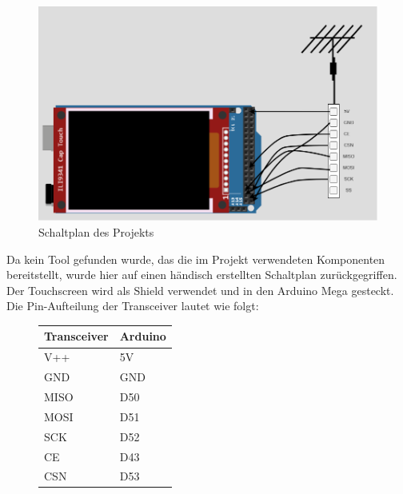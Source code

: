\documentclass[a4paper, 11pt]{scrartcl}
\begin{document}
\begin{small}
\begin{figure}[H]
    \begin{center}
        \includegraphics[scale=0.4]{Bilder/schaltplan.png}
        \caption{Schaltplan des Projekts}\label{diag:schaltplan}
    \end{center}
\end{figure}

Da kein Tool gefunden wurde, das die im Projekt verwendeten Komponenten bereitstellt, wurde hier auf einen händisch erstellten Schaltplan zurückgegriffen.
Der Touchscreen wird als Shield verwendet und in den Arduino Mega gesteckt. Die Pin-Aufteilung der Transceiver lautet wie folgt:

\begin{figure}[H]
    \begin{tabular}{|p{}|p{}|}
        \hline
        \textbf{Transceiver} & \textbf{Arduino}
        \\
        \hline\hline
        V++ & 5V
        \\
        \hline
        GND & GND
        \\
        \hline
        MISO & D50
        \\
        \hline
        MOSI & D51
        \\
        \hline
        SCK & D52
        \\
        \hline
        CE & D43
        \\
        \hline
        CSN & D53
        \\
        \hline
    \end{tabular}
\end{figure}



\end{small}
\end{document}
